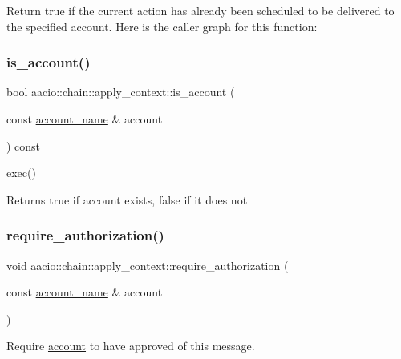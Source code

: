 Return true if the current action has already been scheduled to be delivered to the specified account. Here is the caller graph for this function\+:
\mbox{\label{classaacio_1_1chain_1_1apply__context_a61355dcfe58eb46088a8bd07fe769025}} 
\subsubsection{\texorpdfstring{is\+\_\+account()}{is\_account()}}
{\footnotesize\ttfamily bool aacio\+::chain\+::apply\+\_\+context\+::is\+\_\+account (\begin{DoxyParamCaption}\item[{const \mbox{\hyperlink{structaacio_1_1chain_1_1name}{account\+\_\+name}} \&}]{account }\end{DoxyParamCaption}) const}



exec() 

\begin{DoxyReturn}{Returns}
true if account exists, false if it does not 
\end{DoxyReturn}
\mbox{\label{classaacio_1_1chain_1_1apply__context_accd533bc0e7a40ae398ecad8cee6d64c}} 
\subsubsection{\texorpdfstring{require\+\_\+authorization()}{require\_authorization()}}
{\footnotesize\ttfamily void aacio\+::chain\+::apply\+\_\+context\+::require\+\_\+authorization (\begin{DoxyParamCaption}\item[{const \mbox{\hyperlink{structaacio_1_1chain_1_1name}{account\+\_\+name}} \&}]{account }\end{DoxyParamCaption})}



Require \mbox{\hyperlink{structaccount}{account}} to have approved of this message. 


